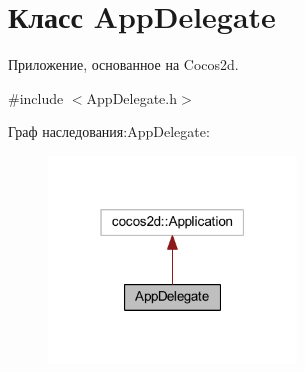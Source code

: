 \hypertarget{class_app_delegate}{}\section{Класс App\+Delegate}
\label{class_app_delegate}


Приложение, основанное на Cocos2d.  




{\ttfamily \#include $<$App\+Delegate.\+h$>$}



Граф наследования\+:App\+Delegate\+:
\nopagebreak
\begin{figure}[H]
\begin{center}
\leavevmode
\includegraphics[width=187pt]{class_app_delegate__inherit__graph}
\end{center}
\end{figure}

